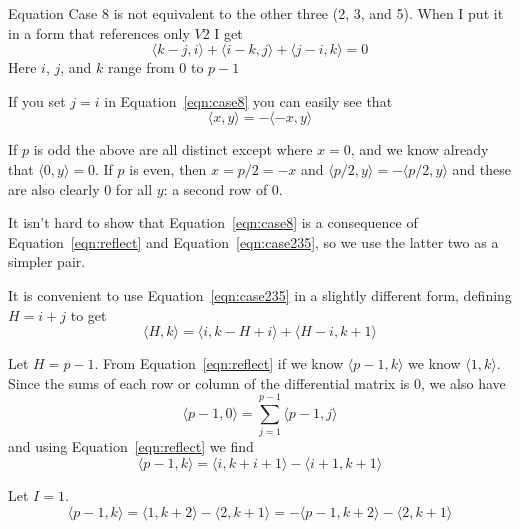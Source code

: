 \documentclass{revtex4-1}
\begin{document}
Equation Case 8 is not equivalent to the other three (2, 3, and 5).  
When I put it in a form that references
only $V2$ I get
\begin{equation} \label{eqn:case8}
 \langle k-j, i\rangle +\langle i-k, j\rangle + \langle j-i, k\rangle = 0
\end{equation}
Here $i$, $j$, and $k$ range from $0$ to $p-1$

\par If you set $j=i$ in Equation~\ref{eqn:case8} you can easily see that
\begin{equation} \label{eqn:reflect}
\langle x, y \rangle = - \langle -x, y \rangle
\end{equation}

\par If $p$ is odd the above are all distinct except where $x=0$, and we know already that 
$\langle 0, y \rangle=0$.  If $p$ is even, then $x=p/2=-x$ and $\langle p/2, y \rangle =
-\langle p/2, y \rangle$ and these are also clearly $0$ for all $y$:  a second row of $0$.

\par It isn't hard to show that Equation~\ref{eqn:case8} is a consequence of
Equation~\ref{eqn:reflect} and Equation~\ref{eqn:case235}, so we use the latter 
two as a simpler pair.

\par It is convenient to use Equation~\ref{eqn:case235} in a slightly different form, defining
$H = i + j$ to get
\begin{equation} \label{eqn:hk}
\langle H, k \rangle = \langle i, k - H + i \rangle + \langle H - i, k + 1 \rangle
\end{equation}

\par Let $H = p-1$.  From Equation~\ref{eqn:reflect} if we know $\langle p-1, k \rangle$
we know $\langle 1, k \rangle$.  Since the sums of each row or column of the differential matrix
is $0$, we also have
\begin{equation}
\langle p-1, 0 \rangle = \sum_{j=1}^{p-1} \langle p-1, j \rangle 
\end{equation}
and using Equation~\ref{eqn:reflect} we find
\begin{equation}
\langle p-1, k \rangle = \langle i, k+i+1 \rangle - \langle i+1, k+1 \rangle
\end{equation}

\par Let $I=1$.
\begin{equation}
\langle p-1, k \rangle = \langle 1, k+2 \rangle - \langle 2, k+1 \rangle =
-\langle p-1, k+2 \rangle - \langle 2, k+1 \rangle
\end{equation}
\end{document}
